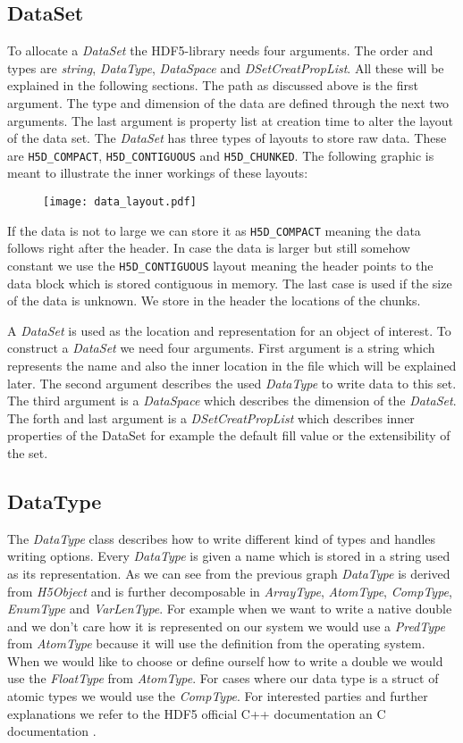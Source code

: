 \documentclass{article}
\begin{document}
\subsection{DataSet}
To allocate a \textit{DataSet} the HDF5-library needs four arguments. The order and types are \textit{string}, \textit{DataType}, \textit{DataSpace} and \textit{DSetCreatPropList}. All these will be explained in the following sections. The path as discussed above is the first argument. The type and dimension of the data are defined through the next two arguments. The last argument is property list at creation time to alter the layout of the data set. The \textit{DataSet} has three types of layouts to store raw data. These are \texttt{H5D\_COMPACT}, \texttt{H5D\_CONTIGUOUS} and \texttt{H5D\_CHUNKED}. The following graphic is meant to illustrate the inner workings of these layouts:

\begin{figure}[h!]
\texttt{[image: data\_layout.pdf]}
\end{figure}


If the data is not to large we can store it as \texttt{H5D\_COMPACT} meaning the data follows right after the header. In case the data is larger but still somehow constant we use the \texttt{H5D\_CONTIGUOUS} layout meaning the header points to the data block which is stored contiguous in memory. The last case is used if the size of the data is unknown. We store in the header the locations of the chunks. 


A \textit{DataSet} is used as the location and representation for an object of interest. To construct a \textit{DataSet} we need four arguments. First argument is a string which represents the name and also the inner location in the file which will be explained later. The second argument describes the used \textit{DataType} to write data to this set. The third argument is a \textit{DataSpace} which describes the dimension of the \textit{DataSet}. The forth and last argument is a \textit{DSetCreatPropList} which describes inner properties of the DataSet for example the default fill value or the extensibility of the set.
\subsection{DataType}
The \textit{DataType} class describes how to write different kind of types and handles writing options. Every \textit{DataType} is given a name which is stored in a string used as its representation. As we can see from the previous graph \textit{DataType} is derived from \textit{H5Object} and is further decomposable in \textit{ArrayType}, \textit{AtomType}, \textit{CompType}, \textit{EnumType} and \textit{VarLenType}. For example when we want to write a native double and we don't care how it is represented on our system we would use a \textit{PredType} from \textit{AtomType} because it will use the definition from the operating system. When we would like to choose or define ourself how to write a double we would use the \textit{FloatType} from \textit{AtomType}. For cases where our data type is a struct of atomic types we would use the \textit{CompType}. For interested parties and further explanations we refer to the HDF5 official C++ documentation\cite{hdf5cppdoc} an C documentation \cite{hdf5cdoc}.
\end{document}

